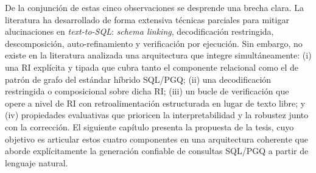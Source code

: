 De la conjunción de estas cinco observaciones se desprende una brecha
clara. La literatura ha desarrollado de forma extensiva técnicas
parciales para mitigar alucinaciones en \emph{text-to-SQL}: \emph{schema
linking}, decodificación restringida, descomposición, auto-refinamiento
y verificación por ejecución. Sin embargo, no existe en la literatura
analizada una arquitectura que integre simultáneamente: (i) una RI
explícita y tipada que cubra tanto el componente relacional como el de
patrón de grafo del estándar híbrido \ac{SQL}/\ac{PGQ}; (ii) una
decodificación restringida o composicional sobre dicha RI; (iii) un
bucle de verificación que opere a nivel de RI con retroalimentación
estructurada en lugar de texto libre; y (iv) propiedades evaluativas
que prioricen la interpretabilidad y la robustez junto con la
corrección. El siguiente capítulo presenta la propuesta de la tesis,
cuyo objetivo es articular estos cuatro componentes en una arquitectura
coherente que aborde explícitamente la generación confiable de
consultas \ac{SQL}/\ac{PGQ} a partir de lenguaje natural.
